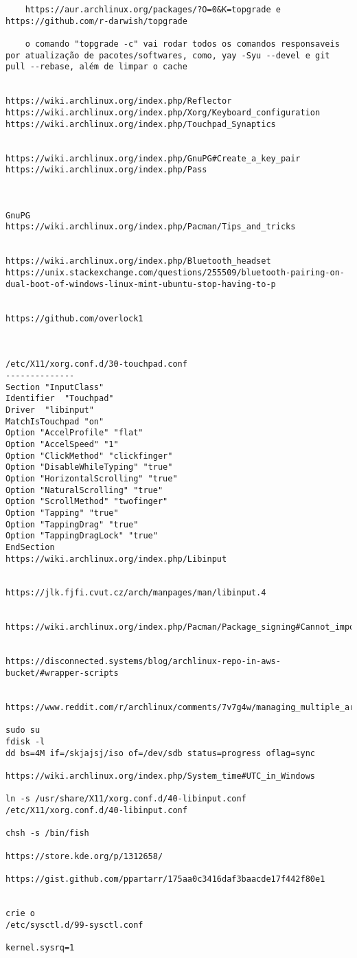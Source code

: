 \documentclass[dark, index]{Iart}
\begin{document}
\begin{lstlisting}
	https://aur.archlinux.org/packages/?O=0&K=topgrade e https://github.com/r-darwish/topgrade
	
	o comando "topgrade -c" vai rodar todos os comandos responsaveis por atualização de pacotes/softwares, como, yay -Syu --devel e git pull --rebase, além de limpar o cache


https://wiki.archlinux.org/index.php/Reflector
https://wiki.archlinux.org/index.php/Xorg/Keyboard_configuration
https://wiki.archlinux.org/index.php/Touchpad_Synaptics


https://wiki.archlinux.org/index.php/GnuPG#Create_a_key_pair
https://wiki.archlinux.org/index.php/Pass



GnuPG
https://wiki.archlinux.org/index.php/Pacman/Tips_and_tricks


https://wiki.archlinux.org/index.php/Bluetooth_headset
https://unix.stackexchange.com/questions/255509/bluetooth-pairing-on-dual-boot-of-windows-linux-mint-ubuntu-stop-having-to-p


https://github.com/overlock1



/etc/X11/xorg.conf.d/30-touchpad.conf
--------------
Section "InputClass"
Identifier  "Touchpad"
Driver  "libinput"
MatchIsTouchpad "on"
Option "AccelProfile" "flat"
Option "AccelSpeed" "1"
Option "ClickMethod" "clickfinger"
Option "DisableWhileTyping" "true"
Option "HorizontalScrolling" "true"
Option "NaturalScrolling" "true"
Option "ScrollMethod" "twofinger"
Option "Tapping" "true"
Option "TappingDrag" "true"
Option "TappingDragLock" "true"
EndSection
https://wiki.archlinux.org/index.php/Libinput


https://jlk.fjfi.cvut.cz/arch/manpages/man/libinput.4


https://wiki.archlinux.org/index.php/Pacman/Package_signing#Cannot_import_keys


https://disconnected.systems/blog/archlinux-repo-in-aws-bucket/#wrapper-scripts


https://www.reddit.com/r/archlinux/comments/7v7g4w/managing_multiple_arch_linux_systems_with/

sudo su
fdisk -l
dd bs=4M if=/skjajsj/iso of=/dev/sdb status=progress oflag=sync

https://wiki.archlinux.org/index.php/System_time#UTC_in_Windows

ln -s /usr/share/X11/xorg.conf.d/40-libinput.conf /etc/X11/xorg.conf.d/40-libinput.conf

chsh -s /bin/fish

https://store.kde.org/p/1312658/

https://gist.github.com/ppartarr/175aa0c3416daf3baacde17f442f80e1


crie o
/etc/sysctl.d/99-sysctl.conf

kernel.sysrq=1

\end{lstlisting}
\end{document}
